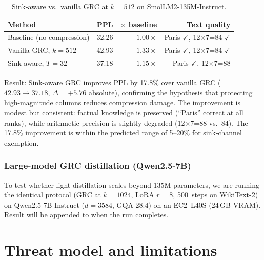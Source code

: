 \documentclass[11pt]{article}
\begin{document}
\begin{table}[h]\centering\small
\caption{Sink-aware vs.\ vanilla GRC at $k{=}512$ on SmolLM2-135M-Instruct.}
\begin{tabular}{@{}lrrr@{}}
\toprule
Method & PPL & $\times$ baseline & Text quality \\
\midrule
Baseline (no compression) & 32.26 & $1.00{\times}$ & Paris $\checkmark$, 12×7=84 $\checkmark$ \\
Vanilla GRC, $k{=}512$  & 42.93 & $1.33{\times}$ & Paris $\checkmark$, 12×7=84 $\checkmark$ \\
Sink-aware, $T{=}32$     & 37.18 & $\mathbf{1.15{\times}}$ & Paris $\checkmark$, 12×7=88 \\
\bottomrule
\end{tabular}
\end{table}

Result: Sink-aware GRC improves PPL by 17.8\% over vanilla GRC
($42.93\to 37.18$, $\Delta{=}+5.76$ absolute), confirming the
hypothesis that protecting high-magnitude columns reduces compression
damage.  The improvement is modest but consistent: factual knowledge
is preserved (``Paris'' correct at all ranks), while arithmetic
precision is slightly degraded (12×7=88 vs.\ 84).  The 17.8\%
improvement is within the predicted range of 5--20\% for sink-channel
exemption.

\subsubsection{Large-model GRC distillation (Qwen2.5-7B)}

To test whether light distillation scales beyond 135M parameters, we
are running the identical protocol (GRC at $k{=}1024$, LoRA $r{=}8$,
500~steps on WikiText-2) on Qwen2.5-7B-Instruct ($d{=}3584$, GQA
28:4) on an EC2~L40S (24\,GB VRAM).  Result will be appended to
 when the run completes.

\section{Threat model and limitations}
\label{sec:limits}
\end{document}
